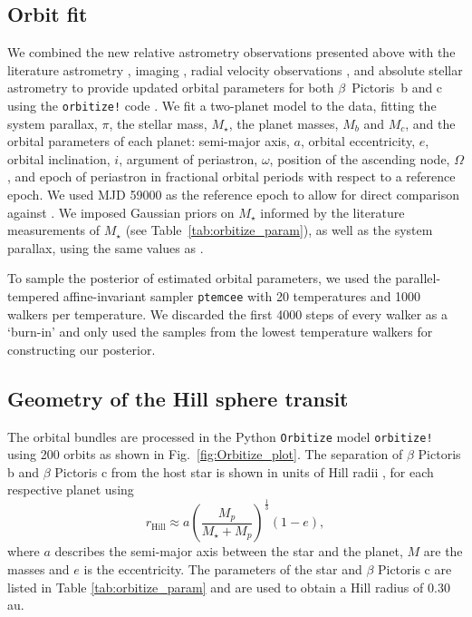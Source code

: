 \documentclass{aa}
\newcommand\picb{$\beta$ Pictoris b}
\newcommand\picc{$\beta$ Pictoris c}
\begin{document}
	\subsection{Orbit fit}
	
	We combined the new relative astrometry observations presented above with the literature astrometry \citep{Lacour_2021, Nowak_2020}, imaging \citep{Lagrange_2020, Nielsen_2020}, radial velocity observations \citep{Lagrange_2020}, and absolute stellar astrometry \citep{Brandt_2021} to provide updated orbital parameters for both $\beta$~Pictoris~b and c using the \texttt{orbitize!} code \citep{orbitize}.
	We fit a two-planet model to the data, fitting the system parallax, $\pi$, the stellar mass, $M_\star$, the planet masses, $M_b$ and $M_c$, and the orbital parameters of each planet: semi-major axis, $a$, orbital eccentricity, $e$, orbital inclination, $i$, argument of periastron, $\omega$, position of the ascending node, $\Omega$, and epoch of periastron in fractional orbital periods with respect to a reference epoch.
	We used MJD 59000 as the reference epoch to allow for direct comparison against \citet{Lacour_2020}.
	We imposed Gaussian priors on $M_\star$ informed by the literature measurements of $M_\star$ (see Table~\ref{tab:orbitize_param}), as well as the system parallax, using the same values as \citet{Lacour_2021}. 
	
	To sample the posterior of estimated orbital parameters, we used the parallel-tempered affine-invariant sampler \texttt{ptemcee} \citep{Foreman-Mackey_2013, Vousden_2016} with 20 temperatures and 1000 walkers per temperature.
	We discarded the first 4000 steps of every walker as a `burn-in' and only used the samples from the lowest temperature walkers for constructing our posterior.
	
	\subsection{Geometry of the Hill sphere transit}\label{sec:Hill_sphere_transit}
	The orbital bundles are processed in the Python \verb|Orbitize| model \texttt{orbitize!} using 200 orbits as shown in Fig.~\ref{fig:Orbitize_plot}.
	The separation of \picb{} and \picc{} from the host star is shown in units of Hill radii \citep{Hamilton_1992}, for each respective planet using
	\begin{equation}
		r_{\text{Hill}} \approx a \left(\frac{M_p}{M_{\star}+M_p} \right)^{\frac{1}{3}}  (1-e),
	\end{equation}
	where $a$ describes the semi-major axis between the star and the planet, $M$ are the masses and $e$ is the eccentricity. 
	The parameters of the star and \picc{} are listed in Table \ref{tab:orbitize_param} and are used to obtain a Hill radius of 0.30 au. 
	
\end{document}
